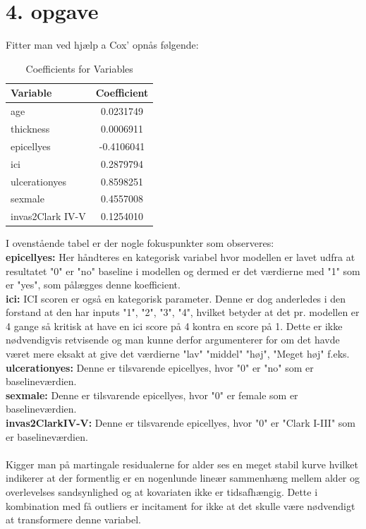 \chapter{4. opgave}
Fitter man ved hjælp a Cox' opnås følgende:
\begin{table}[H]
\centering
\begin{tabular}{|l|c|}
\hline
\textbf{Variable} & \textbf{Coefficient} \\
\hline
age & 0.0231749 \\
thickness & 0.0006911 \\
epicellyes & -0.4106041 \\
ici & 0.2879794 \\
ulcerationyes & 0.8598251 \\
sexmale & 0.4557008 \\
invas2Clark IV-V & 0.1254010 \\
\hline
\end{tabular}
\caption{Coefficients for Variables}
\label{tab:coefficients}
\end{table}
\noindent I ovenstående tabel er der nogle fokuspunkter som observeres:\\
\textbf{epicellyes:} Her håndteres en kategorisk variabel hvor modellen er lavet udfra at resultatet "0" er "no" baseline i modellen og dermed er det værdierne med "1" som er "yes", som pålægges denne koefficient.\\
\textbf{ici:} ICI scoren er også en kategorisk parameter. Denne er dog anderledes i den forstand at den har inputs "1", "2", "3", "4", hvilket betyder at det pr. modellen er 4 gange så kritisk at have en ici score på 4 kontra en score på 1. Dette er ikke nødvendigvis retvisende og man kunne derfor argumenterer for om det havde været mere eksakt at give det værdierne "lav" "middel" "høj", "Meget høj" f.eks.\\
\textbf{ulcerationyes:} Denne er tilsvarende epicellyes, hvor "0" er "no" som er baselineværdien.\\
\textbf{sexmale:} Denne er tilsvarende epicellyes, hvor "0" er female som er baselineværdien.\\
\textbf{invas2ClarkIV-V:} Denne er tilsvarende epicellyes, hvor "0" er "Clark I-III" som er baselineværdien.\\\\
Kigger man på martingale residualerne for alder ses en meget stabil kurve hvilket indikerer at der formentlig er en nogenlunde lineær sammenhæng mellem alder og overlevelses sandsynlighed og at kovariaten ikke er tidsafhængig. Dette i kombination med få outliers er incitament for ikke at det skulle være nødvendigt at transformere denne variabel.\\
